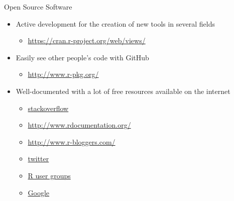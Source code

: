 \documentclass[11pt]{beamer}\usepackage[]{graphicx}\usepackage[]{color}
\begin{document}
\begin{frame}{Open Source Software}

\begin{itemize}
  \setlength\itemsep{1.5em}
\item Active development for the creation of new tools in several fields  
\begin{itemize}
\item \href{https://cran.r-project.org/web/views/}{https://cran.r-project.org/web/views/}
\end{itemize} 
\item Easily see other people's code with GitHub 
\begin{itemize}
\item \href{http://www.r-pkg.org/}{http://www.r-pkg.org/}
\end{itemize}
\item Well-documented with a lot of free resources available on the internet
\begin{itemize}
\item \href{http://stackoverflow.com/questions/tagged/r}{stackoverflow}
\item \href{http://www.rdocumentation.org/}{http://www.rdocumentation.org/} \item \href{http://www.r-bloggers.com/}{http://www.r-bloggers.com/} 
\item \href{https://twitter.com/search?q=\%23rstats}{twitter} 
\item \href{http://blog.revolutionanalytics.com/local-r-groups.html}{R user groups}
\item \href{https://www.google.ca/}{Google}
\end{itemize}
\end{itemize}


\end{frame}
\end{document}
